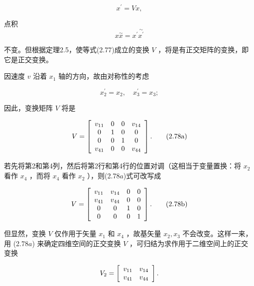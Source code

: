 \begin{equation*}
x ^ {\prime} = V x,
\end{equation*}

点积
\begin{equation*}
x \stackrel {\sim} {x} = x ^ {\prime} \stackrel {\sim} {x ^ {\prime}}\tag{2.77}
\end{equation*}

不变。但根据定理2.5，使等式(2.77)成立的变换 $V$ ，将是有正交矩阵的变换，即它是正交变换。

因速度 $v$ 沿着 $x_{1}$ 轴的方向，故由对称性的考虑

\begin{equation*}
x _ {2} ^ {\prime} = x _ {2}, \quad x _ {3} ^ {\prime} = x _ {3};
\end{equation*}

因此，变换矩阵 $V$ 将是

\begin{equation*}
V = \left[ \begin{array}{c c c c} v _ {1 1} & 0 & 0 & v _ {1 4} \\ 0 & 1 & 0 & 0 \\ 0 & 0 & 1 & 0 \\ v _ {4 1} & 0 & 0 & v _ {4 4} \end{array} \right].\tag{2.78a}
\end{equation*}

若先将第2和第4列，然后将第2行和第4行的位置对调（这相当于变量置换：将 $x_{2}$ 看作 $x_{4}$ ，而将 $x_{4}$ 看作 $x_{2}$ ），则(2.78$a$)式可改写成

\begin{equation*}
V = \left[ \begin{array}{c c c c} v _ {1 1} & v _ {1 4} & 0 & 0 \\ v _ {4 1} & v _ {4 4} & 0 & 0 \\ 0 & 0 & 1 & 0 \\ 0 & 0 & 0 & 1 \end{array} \right].\tag{2.78b}
\end{equation*}

但显然，变换 $V$ 仅作用于矢量 $x_{1}$ 和 $x_{4}$ ，故基矢量 $x_{2}, x_{3}$ 不会改变。这样一来，用 (2.78$a$) 来确定四维空间的正交变换 $V$ ，可归结为求作用于二维空间上的正交变换

\begin{equation*}
V _ {2} = \left[ \begin{array}{l l} v _ {1 1} & v _ {1 4} \\ v _ {4 1} & v _ {4 4} \end{array} \right].
\end{equation*}

